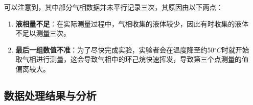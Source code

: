 \documentclass[12pt]{article}
\begin{document}
			\par
			可以注意到，其中部分气相数据并未平行记录三次，其原因由以下两点：\par
			\begin{enumerate}
				\item \textbf{液相量不足}：在实际测量过程中，气相收集的液体较少，因此有时收集的液体不足以测量三次。\par
				\item \textbf{最后一组数值不准}：为了尽快完成实验，实验者会在温度降至约50$^{\circ}C$时就开始取气相进行测量，这会导致气相中的环己烷快速挥发，导致第三个点测量的值偏离较大。\par
			\end{enumerate}
		\subsection{数据处理结果与分析}
\end{document}
